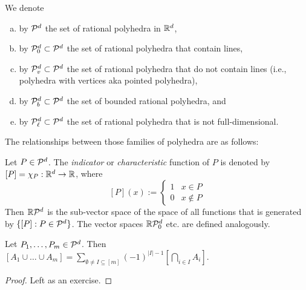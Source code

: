 \begin{definition}
  We denote
  \begin{enumerate}[(a)]
    \item by $\mathcal{P}^d$ the set of rational polyhedra in $\mathbb{R}^d$,
    \item by $\mathcal{P}_0^d \subset \mathcal{P}^d$ the set of rational polyhedra that contain lines,
    \item by $\mathcal{P}_v^d \subset \mathcal{P}^d$ the set of rational polyhedra that do not contain lines (i.e., polyhedra with vertices aka pointed polyhedra),
    \item by $\mathcal{P}_b^d \subset \mathcal{P}^d$ the set of bounded rational polyhedra, and
    \item by $\mathcal{P}_\ell^d \subset \mathcal{P}^d$ the set of rational polyhedra that is not full-dimensional.
  \end{enumerate}
\end{definition}
The relationships between those families of polyhedra are as follows:
\begin{center}
\end{center}

\begin{definition}
  Let $P \in \mathcal{P}^d$.
  The \emph{indicator} or \emph{characteristic} function of $P$ is denoted by $[P] = \chi_P : \mathbb{R}^d \to \mathbb{R}$,
  where
  \[
    [P](x) := \begin{cases}
                1 & x \in P \\
                0 & x \not\in P
              \end{cases}
  \]
  Then $\mathbb{R} \mathcal{P}^d$ is the sub-vector space of the space of all functions
  that is generated by $\{ [P] : P \in \mathcal{P}^d \}$.
  The vector spaces $\mathbb{R} \mathcal{P}_0^d$ etc. are defined analogously.
\end{definition}

\begin{lemma}
  \label{lemma:inclusion-exclusion}
  Let $P_1, \ldots, P_m \in \mathcal{P}^d$.
  Then
  $[A_1 \cup \dots \cup A_m] = \sum_{\emptyset \neq I \subseteq [m]} (-1)^{|I| - 1} [\bigcap_{i \in I} A_i]$.
\end{lemma}
\begin{proof}
  Left as an exercise.
\end{proof}

